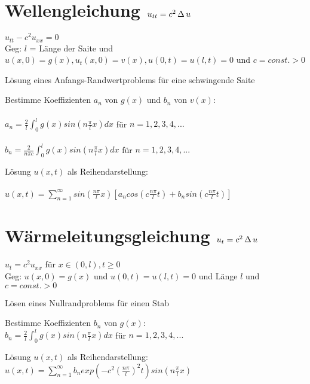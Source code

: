\documentclass[german,color,5pt]{latex4ei/latex4ei_fs}
\begin{document}
\section{Wellengleichung \qquad \(u_{tt}=c^{2} \operatorname{\Delta}{u} \)}
\begin{sectionbox}
\(u_{tt}-c^{2} u_{xx}=0\) \\
Geg: \(l\) = L\"ange der Saite und \(u(x,0)=g(x), u_{t}(x,0)=v(x), u(0,t)=u(l,t)=0\) und \(c=const.>0 \)
\begin{cookbox}{L\"osung eines Anfangs-Randwertproblems f\"ur eine schwingende Saite}
\item Bestimme Koeffizienten \(a_{n}\) von \(g(x)\) und \(b_{n}\) von \(v(x)\): \\ \\
\(a_{n}=\frac{2}{l}\int_0^l  g(x)sin(n\frac{\pi}{l}x)dx\) \qquad f\"ur \(n=1,2,3,4,... \)
\\ \\
\(b_{n}=\frac{2}{n\pi c} \int_0^l  g(x)sin(n\frac{\pi}{l}x)dx\) \qquad f\"ur \(n=1,2,3,4,... \)
\item L\"osung \(u(x,t)\) als Reihendarstellung: \\ \\
\(u(x,t)= \sum_{n=1}^{\infty} sin(\frac{n \pi}{l}x)[a_{n}cos(c\frac{n\pi}{l}t)+b_{n}sin(c\frac{n\pi}{l}t)]\)
\end{cookbox}
\end{sectionbox}

\section{W\"armeleitungsgleichung \qquad \(u_{t}=c^{2} \operatorname{\Delta}{u}\)}
\begin{sectionbox}
\(u_{t}=c^{2}u_{xx}\) f\"ur \(x \in (0,l), t\geq 0\) \\
Geg: \(u(x,0)=g(x)\) und \(u(0,t)=u(l,t)=0\) und L\"ange \(l\) und \(c=const.>0\)
\begin{cookbox}{L\"osen eines Nullrandproblems f\"ur einen Stab}
\item Bestimme Koeffizienten \(b_{n}\) von \(g(x)\): \\
\(b_{n}=\frac{2}{l} \int_{0}^{l} g(x)sin(n\frac{\pi}{l}x)dx\) \qquad f\"ur \(n=1,2,3,4,... \)
\\
\item L\"osung \(u(x,t)\) als Reihendarstellung: \\
\(u(x,t)=\sum_{n=1}^{\infty} b_{n} exp(-c^{2}(\frac{n\pi}{l})^{2}t)sin(n\frac{\pi}{l}x)\)
\end{cookbox}
\end{sectionbox}

\end{document}
